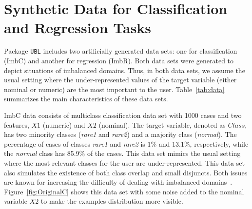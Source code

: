 \documentclass[10pt,a4paper]{article}\usepackage[]{graphicx}\usepackage[]{color}
\newcommand{\UBLp}{\texttt{UBL}\ package  }
\begin{document}
\section{Synthetic Data for Classification and Regression Tasks}\label{sec:syntdata}


Package \texttt{UBL} includes two artificially generated data sets: one for classification (ImbC) and another for regression (ImbR). Both data sets were generated to depict situations of imbalanced domains. Thus, in both data sets, we assume the usual setting where the under-represented values of the target variable (either nominal or numeric) are the most important to the user. Table~\ref{tab:data} summarizes the main characteristics of these data sets.

\begin{table}[!hbt]
\centering
{}
\caption{Description of artificial data sets of \UBLp.}
\label{tab:data}

\end{table}

ImbC data consists of multiclass classification data set with 1000 cases and two features, $X1$ (numeric) and $X2$ (nominal). The target variable, denoted as $Class$, has two minority classes (\textit{rare1} and \textit{rare2}) and a majority class (\textit{normal}). The percentage of cases of classes \textit{rare1} and \textit{rare2} is 1\% and 13.1\%, respectively, while the \textit{normal} class has 85.9\% of the cases. This data set mimics the usual setting where the most relevant classes for the user are under-represented. This data set also simulates the existence of both class overlap and small disjuncts. Both issues are known for increasing the difficulty of dealing with imbalanced domains~\cite{lopez2013insight}. Figure~\ref{fig:OriginalC} shows this data set with some noise added to the nominal variable $X2$ to make the examples distribution more visible.
\end{document}
